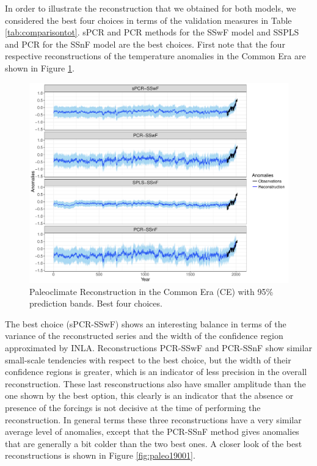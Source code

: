 \documentclass[11pt]{amsart}
\theoremstyle{plain}
\theoremstyle{definition}
\theoremstyle{remark}
\begin{document}
In order to illustrate the reconstruction that we obtained for both models, we
considered the best four choices in terms of the validation measures in Table
\ref{tab:comparisontot}. sPCR and PCR methods for the SSwF model and SSPLS and
PCR for
the SSnF model are the best choices. First note that the four respective reconstructions of the
temperature anomalies in the Common Era are shown in
Figure \ref{fig:paleoCE1}.
\begin{figure}
  \centering
  \includegraphics[scale=0.55]{RecCE_Final}
  \caption{Paleoclimate Reconstruction in the Common Era (CE) with 95\%
    prediction bands. Best four choices.}
  \label{fig:paleoCE1}
\end{figure}
The best choice (sPCR-SSwF) shows an interesting
balance in terms of the variance of the reconstructed series and the width of
the confidence region approximated by INLA. Reconstructions PCR-SSwF and
PCR-SSnF show similar small-scale tendencies with respect to the best choice, but the width of their confidence regions
is greater, which is an indicator of less precision in the overall
reconstruction. These last resconstructions also have smaller amplitude than the one shown by the best
option, this clearly is an indicator that the absence or presence of the
forcings is not decisive at the time of performing the reconstruction. In
general terms these three reconstructions have a very similar average level
of anomalies, except that the PCR-SSnF method gives anomalies that are generally a
bit colder than the two best ones. A closer look of the best reconstructions is shown in Figure
\ref{fig:paleo19001}.
\end{document}

